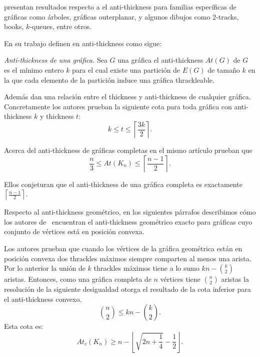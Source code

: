 %
\cite{Dujmovic2017} presentan resultados respecto a el
anti-thickness para familias específicas de gráficas como árboles, gráficas
outerplanar, y algunos dibujos como 2-tracks, books, $k$-queues, entre otros.

En su trabajo definen en anti-thickness como sigue:
\begin{definition}{\emph{Anti-thickness de una gráfica.}}
Sea $G$ una gráfica el anti-thickness $At(G)$ de $G$ es el mínimo entero $k$
para el cual existe una partición de $E(G)$ de tamaño $k$
en la que cada elemento de la partición induce una gráfica thrackleable.
\end{definition}

Además dan una relación entre el thickness y anti-thickness de cualquier
gráfica. Concretamente los autores prueban la siguiente cota para toda gráfica
con anti-thickness $k$ y thickness $t$:
\[ k \leq t \leq \left\lceil \frac{3k}{2}\right\rceil .\]

Acerca del anti-thickness de gráficas completas en el mismo artículo
prueban que \[ \frac{n}{3} \leq  At(K_n) \leq \left\lceil \frac{n-1}{2} \right\rceil . \]

Ellos conjeturan que el anti-thickness de una gráfica completa es
exactamente $\left\lceil \frac{n-1}{2} \right\rceil$.

Respecto al anti-thickness geométrico, en los siguientes párrafos describimos
cómo los autores de~\cite{Fabila-Monroy2018} encuentran el anti-thickness
geométrico exacto para gráficas cuyo conjunto de vértices está en posición
convexa.

Los autores prueban que cuando los vértices de la gráfica geométrica están en
posición convexa dos thrackles máximos siempre comparten al menos una arista.
Por lo anterior la unión de $k$ thrackles máximos tiene a lo sumo $kn -
\binom{k}{2}$ aristas. Entonces, como una gráfica completa de $n$
vértices tiene $\binom{n}{2}$ aristas la resolución de la siguiente desigualdad
otorga el resultado de la cota inferior para el anti-thickness convexo.
\[ \binom{n}{2} \leq kn - \binom{k}{2} .\]
Esta cota es:
\[ At_c(K_n) \geq n - \left\lfloor \sqrt{2n + \frac{1}{4}} - \frac{1}{2} \right\rfloor. \]

